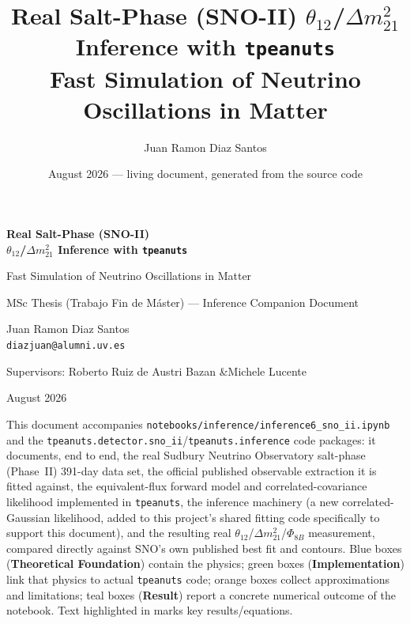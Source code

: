 \documentclass[11pt,a4paper,openany]{report}
\title{\Huge Real Salt-Phase (SNO-II) $\theta_{12}$/$\Delta m^2_{21}$ Inference with \texttt{tpeanuts}\\[4pt]
  \Large Fast Simulation of Neutrino Oscillations in Matter}
\author{Juan Ramon Diaz Santos}
\date{August 2026 --- living document, generated from the source code}
\begin{document}
\begin{titlepage}
  \centering
  \vspace*{1.6cm}
  {\Huge\bfseries\color{snoiiColor} Real Salt-Phase (SNO-II)\\[4pt] $\theta_{12}$/$\Delta m^2_{21}$ Inference with \texttt{tpeanuts}\par}
  \vspace{0.8cm}
  {\Large Fast Simulation of Neutrino Oscillations in Matter\par}
  \vspace{1.5cm}
  {\large MSc Thesis (Trabajo Fin de M\'aster) --- Inference Companion Document\par}
  \vspace{0.3cm}
  {\large Juan Ramon Diaz Santos \\ \texttt{diazjuan@alumni.uv.es}\par}
  \vspace{0.6cm}
  {\normalsize Supervisors: Roberto Ruiz de Austri Bazan \quad\&\quad Michele Lucente\par}
  \vfill
  {\normalsize August 2026\par}
  \vspace{0.5cm}
  \begin{tcolorbox}[colback=snoiiColor!5,colframe=snoiiColor,width=0.85\textwidth,sharp corners=all,rounded corners=all,arc=1mm]
    \small
    This document accompanies \texttt{notebooks/inference/inference6\_sno\_ii.ipynb} and the
    \texttt{tpeanuts.detector.sno\_ii}/\texttt{tpeanuts.inference} code packages: it documents,
    end to end, the real Sudbury Neutrino Observatory salt-phase (Phase~II) 391-day data set, the
    official published observable extraction it is fitted against, the equivalent-flux forward
    model and correlated-covariance likelihood implemented in \texttt{tpeanuts}, the inference
    machinery (a new correlated-Gaussian likelihood, added to this project's shared fitting code
    specifically to support this document), and the resulting real $\theta_{12}$/$\Delta
    m^2_{21}$/$\Phi_{8B}$ measurement, compared directly against SNO's own published best fit and
    contours. Blue boxes (\textbf{Theoretical Foundation}) contain the physics; green boxes
    (\textbf{Implementation}) link that physics to actual \texttt{tpeanuts} code; orange boxes
    collect approximations and limitations; teal boxes (\textbf{Result}) report a concrete
    numerical outcome of the notebook. Text highlighted in  marks key
    results/equations.
  \end{tcolorbox}
\end{titlepage}
\end{document}
